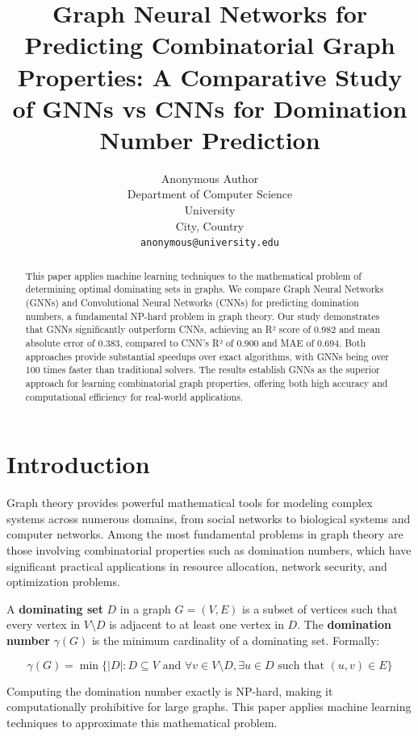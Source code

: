 \documentclass{article}
\title{Graph Neural Networks for Predicting Combinatorial Graph Properties: A Comparative Study of GNNs vs CNNs for Domination Number Prediction}
\author{%
  Anonymous Author \\
  Department of Computer Science \\
  University \\
  City, Country \\
  \texttt{anonymous@university.edu} \\
}
\begin{document}
\maketitle

\begin{abstract}
  This paper applies machine learning techniques to the mathematical problem of determining optimal dominating sets in graphs. We compare Graph Neural Networks (GNNs) and Convolutional Neural Networks (CNNs) for predicting domination numbers, a fundamental NP-hard problem in graph theory. Our study demonstrates that GNNs significantly outperform CNNs, achieving an R² score of 0.982 and mean absolute error of 0.383, compared to CNN's R² of 0.900 and MAE of 0.694. Both approaches provide substantial speedups over exact algorithms, with GNNs being over 100 times faster than traditional solvers. The results establish GNNs as the superior approach for learning combinatorial graph properties, offering both high accuracy and computational efficiency for real-world applications.
\end{abstract}

\section{Introduction}

Graph theory provides powerful mathematical tools for modeling complex systems across numerous domains, from social networks to biological systems and computer networks. Among the most fundamental problems in graph theory are those involving combinatorial properties such as domination numbers, which have significant practical applications in resource allocation, network security, and optimization problems.

A \textbf{dominating set} $D$ in a graph $G = (V, E)$ is a subset of vertices such that every vertex in $V \setminus D$ is adjacent to at least one vertex in $D$. The \textbf{domination number} $\gamma(G)$ is the minimum cardinality of a dominating set. Formally:

\begin{equation}
\gamma(G) = \min\{|D| : D \subseteq V \text{ and } \forall v \in V \setminus D, \exists u \in D \text{ such that } (u,v) \in E\}
\end{equation}

Computing the domination number exactly is NP-hard, making it computationally prohibitive for large graphs. This paper applies machine learning techniques to approximate this mathematical problem.
\end{document}
